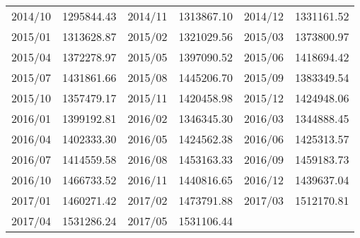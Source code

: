 \begin{center}
\begin{longtable}{rr|rr|rr}
    2014/10 & 1295844.43 & 2014/11 & 1313867.10 & 2014/12 & 1331161.52 \\
    2015/01 & 1313628.87 & 2015/02 & 1321029.56 & 2015/03 & 1373800.97 \\
    2015/04 & 1372278.97 & 2015/05 & 1397090.52 & 2015/06 & 1418694.42 \\
    2015/07 & 1431861.66 & 2015/08 & 1445206.70 & 2015/09 & 1383349.54 \\
    2015/10 & 1357479.17 & 2015/11 & 1420458.98 & 2015/12 & 1424948.06 \\
    2016/01 & 1399192.81 & 2016/02 & 1346345.30 & 2016/03 & 1344888.45 \\
    2016/04 & 1402333.30 & 2016/05 & 1424562.38 & 2016/06 & 1425313.57 \\
    2016/07 & 1414559.58 & 2016/08 & 1453163.33 & 2016/09 & 1459183.73 \\
    2016/10 & 1466733.52 & 2016/11 & 1440816.65 & 2016/12 & 1439637.04 \\
    2017/01 & 1460271.42 & 2017/02 & 1473791.88 & 2017/03 & 1512170.81 \\
    2017/04 & 1531286.24 & 2017/05 & 1531106.44 &       &  \\
\end{longtable}
\end{center}

